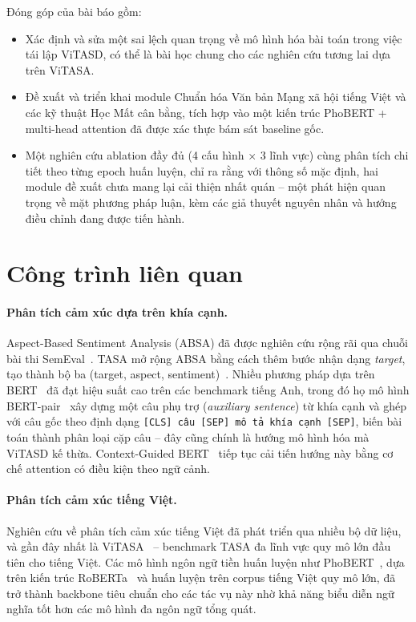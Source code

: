 \documentclass[11pt]{article}
\begin{document}
Đóng góp của bài báo gồm:
\begin{itemize}
    \item Xác định và sửa một sai lệch quan trọng về mô hình hóa bài toán trong việc tái lập ViTASD, có thể là bài học chung cho các nghiên cứu tương lai dựa trên ViTASA.
    \item Đề xuất và triển khai module Chuẩn hóa Văn bản Mạng xã hội tiếng Việt và các kỹ thuật Học Mất cân bằng, tích hợp vào một kiến trúc PhoBERT + multi-head attention đã được xác thực bám sát baseline gốc.
    \item Một nghiên cứu ablation đầy đủ (4 cấu hình $\times$ 3 lĩnh vực) cùng phân tích chi tiết theo từng epoch huấn luyện, chỉ ra rằng với thông số mặc định, hai module đề xuất chưa mang lại cải thiện nhất quán -- một phát hiện quan trọng về mặt phương pháp luận, kèm các giả thuyết nguyên nhân và hướng điều chỉnh đang được tiến hành.
\end{itemize}


\section{Công trình liên quan}
\label{sec:related}

\paragraph{Phân tích cảm xúc dựa trên khía cạnh.} Aspect-Based Sentiment Analysis (ABSA) đã được nghiên cứu rộng rãi qua chuỗi bài thi SemEval~\citep{pontiki2014semeval}. TASA mở rộng ABSA bằng cách thêm bước nhận dạng \textit{target}, tạo thành bộ ba (target, aspect, sentiment)~\citep{saeidi2016sentihood}. Nhiều phương pháp dựa trên BERT~\citep{devlin2019bert} đã đạt hiệu suất cao trên các benchmark tiếng Anh, trong đó họ mô hình BERT-pair~\citep{sun2019utilizing} xây dựng một câu phụ trợ (\textit{auxiliary sentence}) từ khía cạnh và ghép với câu gốc theo định dạng \texttt{[CLS] câu [SEP] mô tả khía cạnh [SEP]}, biến bài toán thành phân loại cặp câu -- đây cũng chính là hướng mô hình hóa mà ViTASD kế thừa. Context-Guided BERT~\citep{wu2021context} tiếp tục cải tiến hướng này bằng cơ chế attention có điều kiện theo ngữ cảnh.

\paragraph{Phân tích cảm xúc tiếng Việt.} Nghiên cứu về phân tích cảm xúc tiếng Việt đã phát triển qua nhiều bộ dữ liệu, và gần đây nhất là ViTASA~\citep{tran2025vitasa} -- benchmark TASA đa lĩnh vực quy mô lớn đầu tiên cho tiếng Việt. Các mô hình ngôn ngữ tiền huấn luyện như PhoBERT~\citep{nguyen2020phobert}, dựa trên kiến trúc RoBERTa~\citep{liu2019roberta} và huấn luyện trên corpus tiếng Việt quy mô lớn, đã trở thành backbone tiêu chuẩn cho các tác vụ này nhờ khả năng biểu diễn ngữ nghĩa tốt hơn các mô hình đa ngôn ngữ tổng quát.
\end{document}

